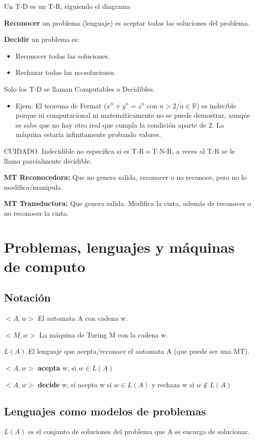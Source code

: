 Un T-D es un T-R, siguiendo el diagrama

\textbf{Reconocer} un problema (lenguaje) es aceptar todas las soluciones del problema.

\textbf{Decidir} un problema es:
\begin{itemize}
    \item Reconocer todas las soluciones.
    \item Rechazar todas las no-soluciones.
\end{itemize}

Solo los T-D se llaman Computables o Decidibles.
\begin{itemize}
    \item Ejem. El teorema de Fermat ($x^n + y^n = z^n$ con $n>2 / n \in \mathbb{R}$) es indecible porque ni computacional ni matemáticamente no se puede demostrar, aunque se sabe que no hay otro real que cumpla la condición aparte de 2. La máquina estaría infinitamente probando valores.
\end{itemize}

CUIDADO. Indecidible no especifica si es T-R o T-N-R, a veces al T-R se le llama parcialmente decidible.

\textbf{MT Reconocedora:} Que no genera salida, reconocer o no reconoce, pero no lo modifica/manipula.

\textbf{MT Transductora:} Que genera salida. Modifica la cinta, además de reconocer o no reconocer la cinta.

\section{Problemas, lenguajes y máquinas de computo}
\subsection{Notación}
$<A,w>$ El automata A con cadena w.

$<M,w>$ La máquina de Turing M con la cadena w.

$L(A)$ El lenguaje que acepta/reconoce el automata A (que puede ser una MT). 

$<A, w>$ \textbf{acepta} w, si $w \in L(A)$ 

$<A, w>$ \textbf{decide} w, si acepta w si $w \in L(A)$ y rechaza w si $w \notin L(A)$

\subsection{Lenguajes como modelos de problemas}
$L(A)$ es el conjunto de soluciones del problema que A se encarga de solucionar.

